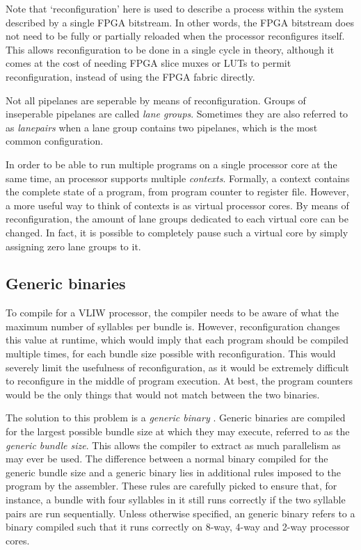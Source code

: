 Note that `reconfiguration' here is used to describe a process within the system 
described by a single FPGA bitstream. In other words, the FPGA bitstream does 
not need to be fully or partially reloaded when the \rvex{} processor 
reconfigures itself. This allows reconfiguration to be done in a single cycle in 
theory, although it comes at the cost of needing FPGA slice muxes or LUTs to 
permit reconfiguration, instead of using the FPGA fabric directly.

Not all pipelanes are seperable by means of reconfiguration. Groups of 
inseperable pipelanes are called \textit{lane groups}. Sometimes they are also 
referred to as \textit{lanepairs} when a lane group contains two pipelanes, 
which is the most common configuration.

In order to be able to run multiple programs on a single \rvex{} processor core 
at the same time, an \rvex{} processor supports multiple \textit{contexts}. 
Formally, a context contains the complete state of a program, from program 
counter to register file. However, a more useful way to think of \rvex{} 
contexts is as virtual processor cores. By means of reconfiguration, the amount 
of lane groups dedicated to each virtual core can be changed. In fact, it is 
possible to completely pause such a virtual core by simply assigning zero lane 
groups to it.

\subsection{Generic binaries}
\label{sec:core-ug-intro-gen-bin}

To compile for a VLIW processor, the compiler needs to be aware of what the 
maximum number of syllables per bundle is. However, reconfiguration changes this 
value at runtime, which would imply that each program should be compiled 
multiple times, for each bundle size possible with reconfiguration. This would 
severely limit the usefulness of reconfiguration, as it would be extremely 
difficult to reconfigure in the middle of program execution. At best, the 
program counters would be the only things that would not match between the two 
binaries.

The solution to this problem is a \textit{generic binary} \cite{brandon2013}.
Generic binaries are compiled for the largest possible bundle size at which
they may execute, referred to as the \textit{generic bundle size}. This allows
the compiler to extract as much parallelism as may ever be used. The difference
between a normal binary compiled for the generic bundle size and a generic
binary lies in additional rules imposed to the program by the assembler. These
rules are carefully picked to ensure that, for instance, a bundle with four
syllables in it still runs correctly if the two syllable pairs are run
sequentially. Unless otherwise specified, an \rvex{} generic binary refers to a
binary compiled such that it runs correctly on 8-way, 4-way and 2-way \rvex{}
processor cores.

